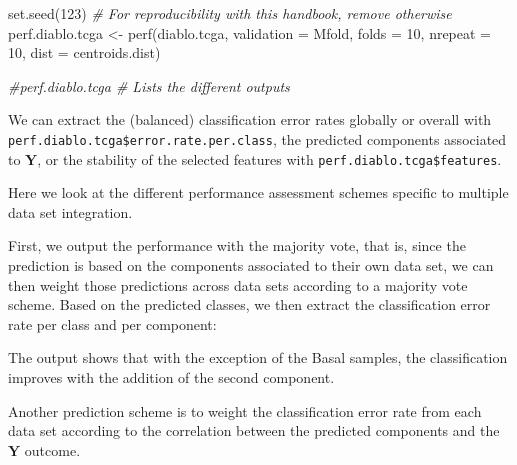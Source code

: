 \documentclass[
]{book}
\newenvironment{Shaded}{\begin{snugshade}}{\end{snugshade}}
\newcommand{\AttributeTok}[1]{\textcolor[rgb]{0.77,0.63,0.00}{#1}}
\newcommand{\CommentTok}[1]{\textcolor[rgb]{0.56,0.35,0.01}{\textit{#1}}}
\newcommand{\DecValTok}[1]{\textcolor[rgb]{0.00,0.00,0.81}{#1}}
\newcommand{\FunctionTok}[1]{\textcolor[rgb]{0.00,0.00,0.00}{#1}}
\newcommand{\NormalTok}[1]{#1}
\newcommand{\OtherTok}[1]{\textcolor[rgb]{0.56,0.35,0.01}{#1}}
\newcommand{\SpecialCharTok}[1]{\textcolor[rgb]{0.00,0.00,0.00}{#1}}
\newcommand{\StringTok}[1]{\textcolor[rgb]{0.31,0.60,0.02}{#1}}
\begin{document}
\begin{Shaded}
\begin{Highlighting}[]
\FunctionTok{set.seed}\NormalTok{(}\DecValTok{123}\NormalTok{) }\CommentTok{\# For reproducibility with this handbook, remove otherwise}
\NormalTok{perf.diablo.tcga }\OtherTok{\textless{}{-}} \FunctionTok{perf}\NormalTok{(diablo.tcga,  }\AttributeTok{validation =} \StringTok{\textquotesingle{}Mfold\textquotesingle{}}\NormalTok{, }\AttributeTok{folds =} \DecValTok{10}\NormalTok{, }
                         \AttributeTok{nrepeat =} \DecValTok{10}\NormalTok{, }\AttributeTok{dist =} \StringTok{\textquotesingle{}centroids.dist\textquotesingle{}}\NormalTok{)}

\CommentTok{\#perf.diablo.tcga  \# Lists the different outputs}
\end{Highlighting}
\end{Shaded}

We can extract the (balanced) classification error rates globally or overall with
\texttt{perf.diablo.tcga\$error.rate.per.class}, the predicted components associated to \(\boldsymbol Y\), or the stability of the selected features with \texttt{perf.diablo.tcga\$features}.

Here we look at the different performance assessment schemes specific to multiple data set integration.

First, we output the performance with the majority vote, that is, since the prediction is based on the components associated to their own data set, we can then weight those predictions across data sets according to a majority vote scheme. Based on the predicted classes, we then extract the classification error rate per class and per component:

\begin{Shaded}
\end{Shaded}

The output shows that with the exception of the Basal samples, the classification improves with the addition of the second component.

Another prediction scheme is to weight the classification error rate from each data set according to the correlation between the predicted components and the \(\boldsymbol Y\) outcome.

\begin{Shaded}
\end{Shaded}
\end{document}
